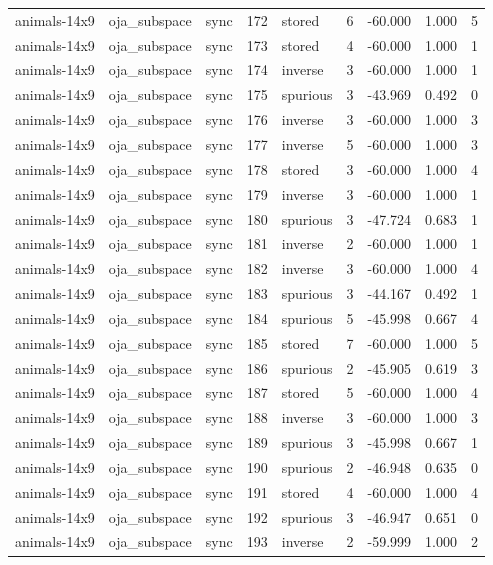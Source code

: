 \begin{tabular}{lllrlrrrr}
animals-14x9 & oja\_subspace & sync & 172 & stored & 6 & -60.000 & 1.000 & 5 \\
animals-14x9 & oja\_subspace & sync & 173 & stored & 4 & -60.000 & 1.000 & 1 \\
animals-14x9 & oja\_subspace & sync & 174 & inverse & 3 & -60.000 & 1.000 & 1 \\
animals-14x9 & oja\_subspace & sync & 175 & spurious & 3 & -43.969 & 0.492 & 0 \\
animals-14x9 & oja\_subspace & sync & 176 & inverse & 3 & -60.000 & 1.000 & 3 \\
animals-14x9 & oja\_subspace & sync & 177 & inverse & 5 & -60.000 & 1.000 & 3 \\
animals-14x9 & oja\_subspace & sync & 178 & stored & 3 & -60.000 & 1.000 & 4 \\
animals-14x9 & oja\_subspace & sync & 179 & inverse & 3 & -60.000 & 1.000 & 1 \\
animals-14x9 & oja\_subspace & sync & 180 & spurious & 3 & -47.724 & 0.683 & 1 \\
animals-14x9 & oja\_subspace & sync & 181 & inverse & 2 & -60.000 & 1.000 & 1 \\
animals-14x9 & oja\_subspace & sync & 182 & inverse & 3 & -60.000 & 1.000 & 4 \\
animals-14x9 & oja\_subspace & sync & 183 & spurious & 3 & -44.167 & 0.492 & 1 \\
animals-14x9 & oja\_subspace & sync & 184 & spurious & 5 & -45.998 & 0.667 & 4 \\
animals-14x9 & oja\_subspace & sync & 185 & stored & 7 & -60.000 & 1.000 & 5 \\
animals-14x9 & oja\_subspace & sync & 186 & spurious & 2 & -45.905 & 0.619 & 3 \\
animals-14x9 & oja\_subspace & sync & 187 & stored & 5 & -60.000 & 1.000 & 4 \\
animals-14x9 & oja\_subspace & sync & 188 & inverse & 3 & -60.000 & 1.000 & 3 \\
animals-14x9 & oja\_subspace & sync & 189 & spurious & 3 & -45.998 & 0.667 & 1 \\
animals-14x9 & oja\_subspace & sync & 190 & spurious & 2 & -46.948 & 0.635 & 0 \\
animals-14x9 & oja\_subspace & sync & 191 & stored & 4 & -60.000 & 1.000 & 4 \\
animals-14x9 & oja\_subspace & sync & 192 & spurious & 3 & -46.947 & 0.651 & 0 \\
animals-14x9 & oja\_subspace & sync & 193 & inverse & 2 & -59.999 & 1.000 & 2 \\

\end{tabular}
